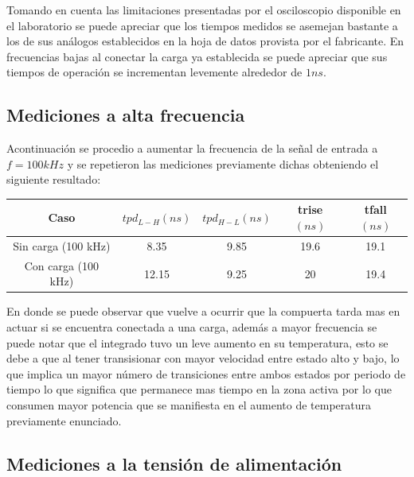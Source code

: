 Tomando en cuenta las limitaciones presentadas por el osciloscopio disponible en el laboratorio se puede apreciar que los tiempos medidos se asemejan bastante a los de sus análogos establecidos en la hoja de datos provista por el fabricante. En frecuencias bajas al conectar la carga  ya establecida se puede apreciar que sus tiempos de operación se incrementan levemente alrededor de $1 ns$. 

\subsection{Mediciones a alta frecuencia}
Acontinuación se procedio a aumentar la frecuencia de la señal de entrada a $f=100 kHz$ y se repetieron las mediciones previamente dichas obteniendo el siguiente resultado:


\begin{table}[H]
\centering
\begin{tabular}{|c|c|c|c|c|}
\hline

Caso & $tpd_{L-H}(ns)$ & $tpd_{H-L}(ns)$ & trise$(ns)$ & tfall$(ns)$ \\ \hline
Sin carga (100 kHz) & 8.35 & 9.85 & 19.6 & 19.1 \\ \hline
Con carga (100 kHz) & 12.15 & 9.25 & 20 & 19.4 \\ \hline
\end{tabular}
\end{table}

En donde se puede observar que vuelve a ocurrir que la compuerta tarda mas en actuar si se encuentra conectada a una carga, además a mayor frecuencia se puede notar que el integrado tuvo un leve aumento en su temperatura, esto se debe a que al tener transisionar con mayor velocidad entre estado alto y bajo, lo que implica un mayor número de transiciones entre ambos estados por periodo de tiempo lo que significa que permanece mas tiempo en la zona activa por lo que consumen mayor potencia que se manifiesta en el aumento de temperatura previamente enunciado.

\subsection{Mediciones a la tensión de alimentación}


